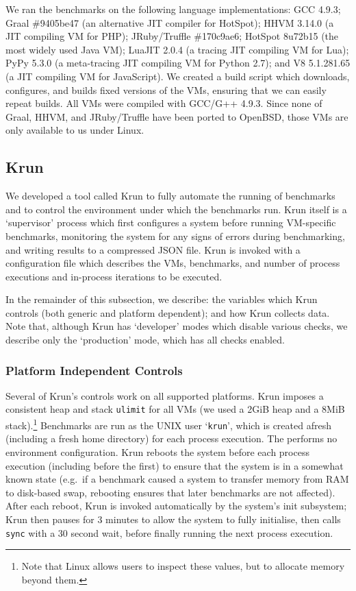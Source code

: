 \documentclass[preprint,numbers,10pt]{sigplanconf}
\newcommand{\krun}{Krun\xspace}
\begin{document}
We ran the benchmarks on the following language implementations: GCC 4.9.3;
Graal \#9405be47 (an alternative JIT compiler for HotSpot); HHVM 3.14.0 (a JIT
compiling VM for PHP); JRuby/Truffle \#170c9ae6; HotSpot 8u72b15 (the most widely used Java
VM); LuaJIT 2.0.4 (a tracing JIT compiling VM for Lua); PyPy 5.3.0 (a
meta-tracing JIT compiling VM for Python 2.7); and V8 5.1.281.65 (a JIT
compiling VM for JavaScript). We created a build script which downloads,
configures, and builds fixed versions of the VMs, ensuring that we can easily
repeat builds. All VMs were compiled with GCC/G++ 4.9.3. Since none of Graal,
HHVM, and JRuby/Truffle have been ported to OpenBSD, those VMs are only
available to us under Linux.


\subsection{\krun}
\label{krun}

We developed a tool called \krun to fully automate the running of benchmarks
and to control the environment under which the benchmarks run. \krun itself is a
`supervisor' process which first configures a system before running VM-specific
benchmarks, monitoring the system for any signs of errors during benchmarking,
and writing results to a compressed JSON file. \krun is invoked with a
configuration file which describes the VMs, benchmarks, and number of process
executions and in-process iterations to
be executed.

In the remainder of this subsection, we describe: the variables which \krun
controls (both generic and platform dependent); and how \krun collects data.
Note that, although \krun has `developer' modes which disable various checks,
we describe only the `production' mode, which has all checks enabled.


\subsubsection{Platform Independent Controls}

Several of \krun's controls work on all supported platforms. \krun imposes a
consistent heap and stack \texttt{ulimit} for all
VMs (we used a 2GiB heap and a 8MiB stack).\footnote{Note that Linux allows users
to inspect these values, but to allocate memory beyond them.} Benchmarks are run
as the UNIX user `\texttt{krun}', which is created afresh (including a fresh
home directory) for each process execution. The performs no environment
configuration.
\krun reboots the system before each process execution (including
before the first) to ensure that the system is in a somewhat known state
(e.g.~if a benchmark caused a system to transfer memory from RAM to disk-based swap,
rebooting ensures that later benchmarks are not affected). After each reboot, \krun
is invoked automatically by the system's init subsystem; \krun then pauses for
3 minutes to allow the system to fully initialise, then calls \texttt{sync}
with a 30 second wait, before finally running the next process execution.
\end{document}
